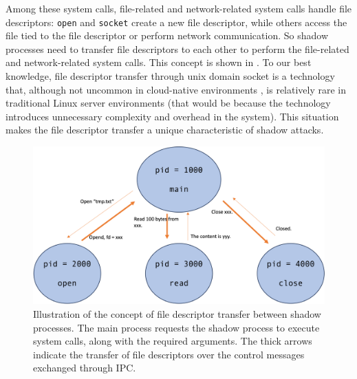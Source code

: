 Among these system calls, file-related and network-related system calls handle file descriptors:
\texttt{open} and \texttt{socket} create a new file descriptor,
while others access the file tied to the file descriptor or perform network communication.
So shadow processes need to transfer file descriptors to each other to perform the file-related and
network-related system calls. This concept is shown in .
To our best knowledge, file descriptor transfer through unix domain socket is a technology that, although not uncommon
in cloud-native environments \cite{Envoypro3:online,HAProxyT74:online},
is relatively rare in traditional Linux server environments
(that would be because the technology introduces unnecessary complexity and overhead in the system).
This situation makes the file descriptor transfer a unique characteristic of shadow attacks.

\begin{figure}[t]
  \begin{center}
    \includegraphics[width=1.8\columnwidth]{./img/fd_transfer.png}
  \end{center}
  \caption{Illustration of the concept of file descriptor transfer between shadow processes.
    The main process requests the shadow process to execute system calls, along with the required arguments.
    The thick arrows indicate the transfer of file descriptors over the control messages exchanged through IPC.}
  \label{img:fd-transfer}
\end{figure}

